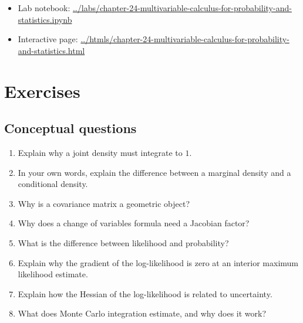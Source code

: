 \documentclass[11pt,oneside]{book}
\begin{document}
\begin{notebox}
\begin{itemize}
  \item Lab notebook: \url{../labs/chapter-24-multivariable-calculus-for-probability-and-statistics.ipynb}
  \item Interactive page: \url{../htmls/chapter-24-multivariable-calculus-for-probability-and-statistics.html}
\end{itemize}
\end{notebox}

\section{Exercises}

\subsection*{Conceptual questions}
\begin{enumerate}
  \item Explain why a joint density must integrate to $1$.
  \item In your own words, explain the difference between a marginal density and a conditional density.
  \item Why is a covariance matrix a geometric object?
  \item Why does a change of variables formula need a Jacobian factor?
  \item What is the difference between likelihood and probability?
  \item Explain why the gradient of the log-likelihood is zero at an interior maximum likelihood estimate.
  \item Explain how the Hessian of the log-likelihood is related to uncertainty.
  \item What does Monte Carlo integration estimate, and why does it work?
\end{enumerate}
\end{document}
